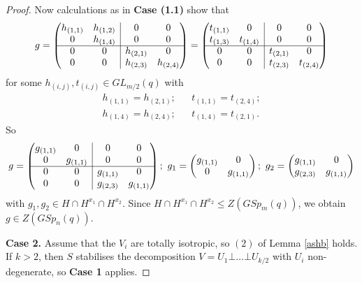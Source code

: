 \begin{proof}
Now calculations as in {\bf Case (1.1)} show that 
$$
g=
\begin{pmatrix}
h_{(1,1)}      & \multicolumn{1}{c|}{h_{(1,2)}}& 0& 0   \\
0      & \multicolumn{1}{c|}{h_{(1,4)}}& 0 & 0 \\ \cline{1-4}
0      & \multicolumn{1}{c|}{0}& h_{(2,1)} & 0   \\
0      & \multicolumn{1}{c|}{0}& h_{(2,3)} & h_{(2,4)}
\end{pmatrix}=
\begin{pmatrix}
t_{(1,1)}      & \multicolumn{1}{c|}{0}& 0& 0   \\
t_{(1,3)}      & \multicolumn{1}{c|}{t_{(1,4)}}& 0 & 0 \\ \cline{1-4}
0      & \multicolumn{1}{c|}{0}& t_{(2,1)} & 0   \\
0      & \multicolumn{1}{c|}{0}& t_{(2,3)} & t_{(2,4)}
\end{pmatrix}
$$
for some $h_{(i,j)}, t_{(i,j)} \in GL_{m/2}(q)$  with 
\begin{align*}
h_{(1,1)}=h_{(2,1)};& &t_{(1,1)}=t_{(2,4)}; \\
h_{(1,4)}=h_{(2,4)};& &t_{(1,4)}=t_{(2,1)}.
\end{align*}
So $$
g=
\begin{pmatrix}
g_{(1,1)}      & \multicolumn{1}{c|}{0}& 0& 0   \\
0      & \multicolumn{1}{c|}{g_{(1,1)}}& 0 & 0 \\ \cline{1-4}
0      & \multicolumn{1}{c|}{0}& g_{(1,1)} & 0   \\
0      & \multicolumn{1}{c|}{0}& g_{(2,3)} & g_{(1,1)}
\end{pmatrix}; \text{ }
g_1 =\begin{pmatrix}
g_{(1,1)}      & {0}   \\
0      & {g_{(1,1)}}
\end{pmatrix}; \text{ }
g_2=
\begin{pmatrix}
 g_{(1,1)} & 0   \\
 g_{(2,3)} & g_{(1,1)}
\end{pmatrix}
$$
with $g_1, g_2 \in H \cap H^{x_1} \cap H^{x_2}.$ Since $H \cap H^{x_1} \cap H^{x_2} \le Z(GSp_m(q))$, we obtain $g \in Z(GSp_n(q)).$ 

\medskip

{\bf Case 2.} Assume that the $V_i$ are totally isotropic, so $(2)$ of Lemma \ref{ashb} holds. If $k>2$, then $S$ stabilises the decomposition $V=U_1 \bot \ldots \bot U_{k/2}$ with $U_i$ non-degenerate, so {\bf Case 1} applies.


\end{proof}
